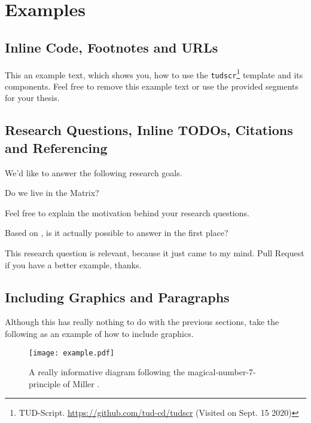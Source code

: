 \chapter{Examples}\label{ch:examples}


\section{Inline Code, Footnotes and URLs}

This an example text, which shows you, how to use the \texttt{tudscr}\footnote{TUD-Script. \url{https://github.com/tud-cd/tudscr} (Visited on Sept. 15 2020)} template and its components. Feel free to remove this example text or use the provided segments for your thesis.

\section{Research Questions, Inline TODOs, Citations and Referencing}

We'd like to answer the following research goals.

\begin{researchquestion}\label{rq:matrix}
Do we live in the Matrix?
\end{researchquestion}

\noindent Feel free to explain the motivation behind your research questions.

\begin{researchquestion}\label{rq:possible}
Based on \cite{gos_2020}, is it actually possible to answer  in the first place?
\end{researchquestion}

\noindent This research question is relevant, because it just came to my mind. Pull Request if you have a better example, thanks.

\section{Including Graphics and Paragraphs}

Although this has really nothing to do with the previous sections, take the following as an example of how to include graphics.

\begin{figure}[H]
\texttt{[image: example.pdf]}
\caption{A really informative diagram following the magical-number-7-principle of Miller \cite{magical_2020}.}\label{fig:example-single}
\end{figure}

